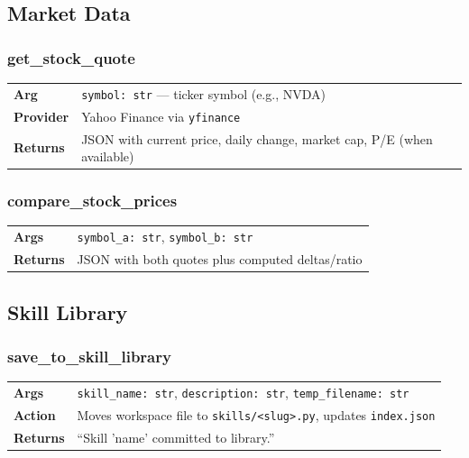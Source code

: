 \documentclass[11pt,a4paper]{article}
\begin{document}
\subsection{Market Data}

\subsubsection{get\_stock\_quote}

\begin{tabular}{@{}lp{10cm}@{}}
\textbf{Arg} & \texttt{symbol: str} --- ticker symbol (e.g., NVDA) \\
\textbf{Provider} & Yahoo Finance via \texttt{yfinance} \\
\textbf{Returns} & JSON with current price, daily change, market cap, P/E (when available) \\
\end{tabular}

\subsubsection{compare\_stock\_prices}

\begin{tabular}{@{}lp{10cm}@{}}
\textbf{Args} & \texttt{symbol\_a: str}, \texttt{symbol\_b: str} \\
\textbf{Returns} & JSON with both quotes plus computed deltas/ratio \\
\end{tabular}

\subsection{Skill Library}

\subsubsection{save\_to\_skill\_library}

\begin{tabular}{@{}lp{10cm}@{}}
\textbf{Args} & \texttt{skill\_name: str}, \texttt{description: str}, \texttt{temp\_filename: str} \\
\textbf{Action} & Moves workspace file to \texttt{skills/<slug>.py}, updates \texttt{index.json} \\
\textbf{Returns} & ``Skill 'name' committed to library.'' \\
\end{tabular}
\end{document}
